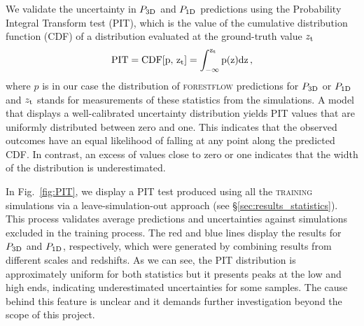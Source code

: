 \documentclass[longauth]{aa}
\newcommand{\poned}{\ensuremath{P_{\rm 1D}}\xspace}
\newcommand{\pthreed}{\ensuremath{P_{\rm 3D}}\xspace}
\newcommand{\forestflow}{\textsc{forestflow}\xspace}
\newcommand{\lacehc}{\textsc{training}\xspace}
\begin{document}
\begin{appendix}
We validate the uncertainty in \pthreed and \poned predictions using the Probability Integral Transform test (PIT), which is the value of the cumulative distribution function (CDF) of a distribution evaluated at the ground-truth value $z_{\rm t}$
%
\begin{equation}
    \rm{PIT} = \mathrm{CDF}[p,\,z_{\rm t}]=\int_{-\infty}^{z_{\rm t}} p(z) \mathrm{d}z\, ,
    \label{eq:pit} 
\end{equation} 
%
where $p$ is in our case the distribution of \forestflow predictions for \pthreed or \poned and $z_{\rm t}$ stands for measurements of these statistics from the simulations. A model that displays a well-calibrated uncertainty distribution yields PIT values that are uniformly distributed between zero and one. This indicates that the observed outcomes have an equal likelihood of falling at any point along the predicted CDF. In contrast, an excess of values close to zero or one indicates that the width of the distribution is underestimated.

In Fig.~\ref{fig:PIT}, we display a PIT test produced using all the \lacehc simulations via a leave-simulation-out approach (see \S\ref{sec:results_statistics}). This process validates average predictions and uncertainties against simulations excluded in the training process. The red and blue lines display the results for \pthreed and \poned, respectively, which were generated by combining results from different scales and redshifts. As we can see, the PIT distribution is approximately uniform for both statistics but it presents peaks at the low and high ends, indicating underestimated uncertainties for some samples. The cause behind this feature is unclear and it demands further investigation beyond the scope of this project.

\end{appendix}
\end{document}
